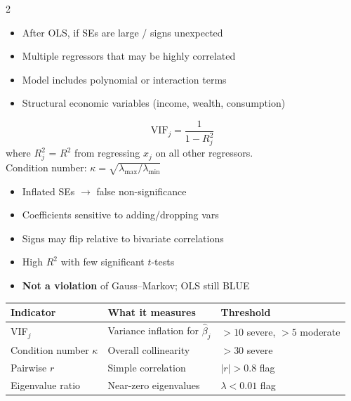 \documentclass[10pt,a4paper]{article}
\begin{document}
\begin{multicols}{2}

\begin{tcolorbox}[when]
\begin{itemize}
  \item After OLS, if SEs are large / signs unexpected
  \item Multiple regressors that may be highly correlated
  \item Model includes polynomial or interaction terms
  \item Structural economic variables (income, wealth, consumption)
\end{itemize}
\end{tcolorbox}

\begin{tcolorbox}[key]
\[
\text{VIF}_j = \frac{1}{1 - R^2_j}
\]
where $R^2_j$ = $R^2$ from regressing $x_j$ on all other regressors.\\
Condition number: $\kappa = \sqrt{\lambda_{\max}/\lambda_{\min}}$
\end{tcolorbox}

\columnbreak

\begin{tcolorbox}[watchout]
\begin{itemize}
  \item Inflated SEs $\to$ false non-significance
  \item Coefficients sensitive to adding/dropping vars
  \item Signs may flip relative to bivariate correlations
  \item High $R^2$ with few significant $t$-tests
  \item \textbf{Not a violation} of Gauss--Markov; OLS still BLUE
\end{itemize}
\end{tcolorbox}

\end{multicols}

\begin{tcolorbox}[tests]
\begin{tabularx}{\linewidth}{lXl}
\toprule
\textbf{Indicator} & \textbf{What it measures} & \textbf{Threshold} \\
\midrule
VIF$_j$ & Variance inflation for $\hat\beta_j$ & $>10$ severe, $>5$ moderate \\
\rowcolor{RowGray}
Condition number $\kappa$ & Overall collinearity & $>30$ severe \\
Pairwise $r$ & Simple correlation & $|r| > 0.8$ flag \\
\rowcolor{RowGray}
Eigenvalue ratio & Near-zero eigenvalues & $\lambda < 0.01$ flag \\
\bottomrule
\end{tabularx}
\end{tcolorbox}
\end{document}
